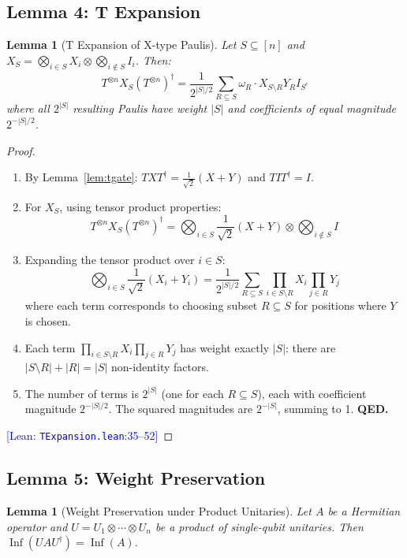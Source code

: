 \documentclass[11pt,a4paper]{article}
\theoremstyle{definition}
\theoremstyle{plain}
\newtheorem{lemma}[theorem]{Lemma}
\newcommand{\proofstep}[2]{\item[$\langle #1 \rangle$#2.]}
\newcommand{\leanref}[2]{\textcolor{blue}{\small [Lean: \texttt{#1}:#2]}}
\DeclareMathOperator{\Inf}{Inf}
\begin{document}
\subsection{Lemma 4: T Expansion}

\begin{lemma}[T Expansion of X-type Paulis] \label{lem:texpansion}
Let $S \subseteq [n]$ and $X_S = \bigotimes_{i \in S} X_i \otimes \bigotimes_{i \notin S} I_i$. Then:
\[
T^{\otimes n} X_S (T^{\otimes n})^\dagger = \frac{1}{2^{|S|/2}} \sum_{R \subseteq S} \omega_R \cdot X_{S \setminus R} Y_R I_{S^c}
\]
where all $2^{|S|}$ resulting Paulis have weight $|S|$ and coefficients of equal magnitude $2^{-|S|/2}$.
\end{lemma}

\begin{proof}
\begin{enumerate}[leftmargin=2em]
\proofstep{1}{1} By Lemma~\ref{lem:tgate}: $TXT^\dagger = \frac{1}{\sqrt{2}}(X + Y)$ and $TIT^\dagger = I$.

\proofstep{1}{2} For $X_S$, using tensor product properties:
\[
T^{\otimes n} X_S (T^{\otimes n})^\dagger = \bigotimes_{i \in S} \frac{1}{\sqrt{2}}(X + Y) \otimes \bigotimes_{i \notin S} I
\]

\proofstep{1}{3} Expanding the tensor product over $i \in S$:
\[
\bigotimes_{i \in S} \frac{1}{\sqrt{2}}(X_i + Y_i) = \frac{1}{2^{|S|/2}} \sum_{R \subseteq S} \prod_{i \in S \setminus R} X_i \prod_{j \in R} Y_j
\]
where each term corresponds to choosing subset $R \subseteq S$ for positions where $Y$ is chosen.

\proofstep{1}{4} Each term $\prod_{i \in S \setminus R} X_i \prod_{j \in R} Y_j$ has weight exactly $|S|$: there are $|S \setminus R| + |R| = |S|$ non-identity factors.

\proofstep{1}{5} The number of terms is $2^{|S|}$ (one for each $R \subseteq S$), each with coefficient magnitude $2^{-|S|/2}$. The squared magnitudes are $2^{-|S|}$, summing to 1. \textbf{QED.}
\end{enumerate}
\leanref{TExpansion.lean}{35--52}
\end{proof}

\subsection{Lemma 5: Weight Preservation}

\begin{lemma}[Weight Preservation under Product Unitaries] \label{lem:weight}
Let $A$ be a Hermitian operator and $U = U_1 \otimes \cdots \otimes U_n$ be a product of single-qubit unitaries. Then $\Inf(U A U^\dagger) = \Inf(A)$.
\end{lemma}
\end{document}
